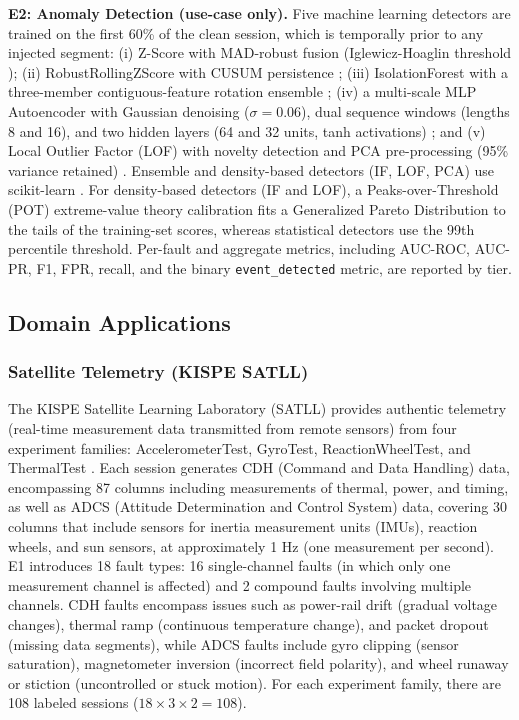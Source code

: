 \documentclass[conference]{IEEEtran}
\begin{document}
\textbf{E2: Anomaly Detection (use-case only).} Five machine learning detectors are trained on the first 60\% of the clean session, which is temporally prior to any injected segment: (i) Z-Score with MAD-robust fusion (Iglewicz-Hoaglin threshold \cite{iglewicz1993outliers}); (ii) RobustRollingZScore with CUSUM persistence \cite{page1954cusum}; (iii) IsolationForest with a three-member contiguous-feature rotation ensemble \cite{liu2008isolation}; (iv) a multi-scale MLP Autoencoder with Gaussian denoising ($\sigma\!=\!0.06$), dual sequence windows (lengths 8 and 16), and two hidden layers (64 and 32 units, tanh activations) \cite{sakurada2014autoencoder}; and (v) Local Outlier Factor (LOF) with novelty detection and PCA pre-processing (95\% variance retained) \cite{breunig2000lof}. Ensemble and density-based detectors (IF, LOF, PCA) use scikit-learn \cite{pedregosa2011sklearn}. For density-based detectors (IF and LOF), a Peaks-over-Threshold (POT) extreme-value theory calibration \cite{siffer2017evt} fits a Generalized Pareto Distribution to the tails of the training-set scores, whereas statistical detectors use the 99th percentile threshold. Per-fault and aggregate metrics, including AUC-ROC, AUC-PR, F1, FPR, recall, and the binary \texttt{event\_detected} metric, are reported by tier.

\subsection{Domain Applications}

\subsubsection{Satellite Telemetry (KISPE SATLL)}

The KISPE Satellite Learning Laboratory (SATLL) provides authentic telemetry (real-time measurement data transmitted from remote sensors) from four experiment families: AccelerometerTest, GyroTest, ReactionWheelTest, and ThermalTest \cite{kispe_satll}. Each session generates CDH (Command and Data Handling) data, encompassing 87 columns including measurements of thermal, power, and timing, as well as ADCS (Attitude Determination and Control System) data, covering 30 columns that include sensors for inertia measurement units (IMUs), reaction wheels, and sun sensors, at approximately 1 Hz (one measurement per second). E1 introduces 18 fault types: 16 single-channel faults (in which only one measurement channel is affected) and 2 compound faults involving multiple channels. CDH faults encompass issues such as power-rail drift (gradual voltage changes), thermal ramp (continuous temperature change), and packet dropout (missing data segments), while ADCS faults include gyro clipping (sensor saturation), magnetometer inversion (incorrect field polarity), and wheel runaway or stiction (uncontrolled or stuck motion). For each experiment family, there are 108 labeled sessions ($18 \times 3 \times 2 = 108$).
\end{document}
